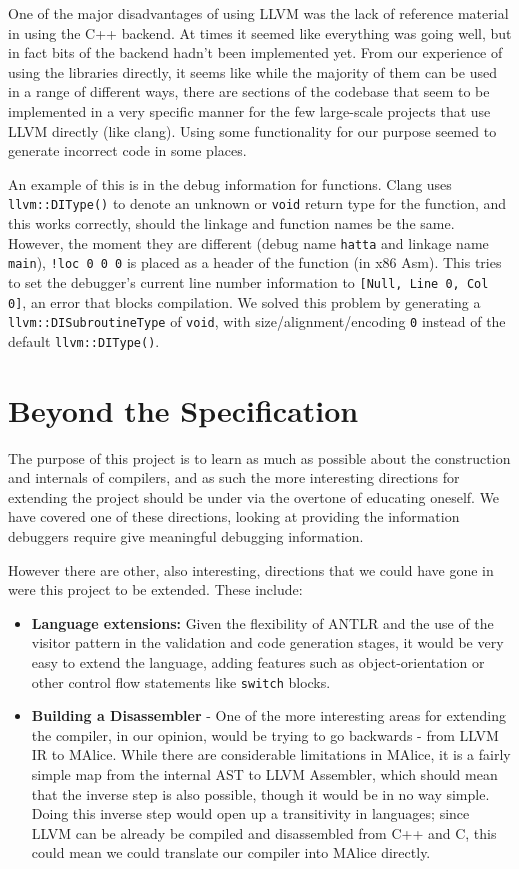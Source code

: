 \documentclass[a4wide, 11pt]{article}
\begin{document}
One of the major disadvantages of using LLVM was the lack of reference material in using the C++ backend. At times it seemed like everything was going well, but in fact bits of the backend hadn't been implemented yet. From our experience of using the libraries directly, it seems like while the majority of them can be used in a range of different ways, there are sections of the codebase that seem to be implemented in a very specific manner for the few large-scale projects that use LLVM directly (like clang). Using some functionality for our purpose seemed to generate incorrect code in some places.

An example of this is in the debug information for functions. Clang uses \texttt{llvm::DIType()} to denote an unknown or \texttt{void} return type for the function, and this works correctly, should the linkage and function names be the same. However, the moment they are different (debug name \texttt{hatta} and linkage name \texttt{main}), \texttt{!loc 0 0 0} is placed as a header of the function (in x86 Asm). This tries to set the debugger's current line number information to \texttt{[Null, Line 0, Col 0]}, an error that blocks compilation. We solved this problem by generating a \texttt{llvm::DISubroutineType} of \texttt{void}, with size/alignment/encoding \texttt{0} instead of the default \texttt{llvm::DIType()}. 

\section{Beyond the Specification}

The purpose of this project is to learn as much as possible about the construction and internals of compilers, and as such the more interesting directions for extending the project should be under via the overtone of educating oneself. We have covered one of these directions, looking at providing the information debuggers require give meaningful debugging information. 

However there are other, also interesting, directions that we could have gone in were this project to be extended. These include:
\begin{itemize}
\item \textbf{Language extensions:} Given the flexibility of ANTLR and the use of the visitor pattern in the validation and code generation stages, it would be very easy to extend the language, adding features such as object-orientation or other control flow statements like \texttt{switch} blocks.
\item \textbf{Building a Disassembler} - One of the more interesting areas for extending the compiler, in our opinion, would be trying to go backwards - from LLVM IR to MAlice. While there are considerable limitations in MAlice, it is a fairly simple map from the internal AST to LLVM Assembler, which should mean that the inverse step is also possible, though it would be in no way simple. Doing this inverse step would open up a transitivity in languages; since LLVM can be already be compiled and disassembled from C++ and C, this could mean we could translate our compiler into MAlice directly.
\end{itemize}
\end{document}
